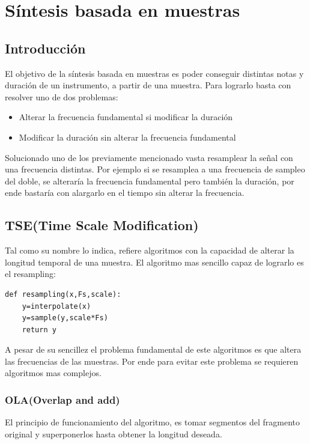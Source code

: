 \documentclass[../ASSD_TP2.tex]{subfiles}
\begin{document}
\section*{Síntesis basada en muestras}
\subsection*{Introducción}
El objetivo de la síntesis basada en muestras es poder conseguir distintas notas y duración de un instrumento, a partir de una muestra. Para lograrlo basta con resolver uno de dos problemas:
\begin{itemize}
\item Alterar la frecuencia fundamental si modificar la duración
\item Modificar la duración sin alterar la frecuencia fundamental
\end{itemize}

Solucionado uno de los previamente mencionado vasta resamplear la se\~nal con una frecuencia distintas. Por ejemplo si se resamplea a una frecuencia de sampleo del doble, se alteraría la frecuencia fundamental pero también la duración, por ende bastaría con alargarlo en el tiempo sin alterar la frecuencia.
\subsection*{TSE(Time Scale Modification)}
Tal como su nombre lo indica, refiere  algoritmos con la capacidad de alterar la longitud temporal de una muestra. El algoritmo mas sencillo capaz de lograrlo es el resampling:

\begin{lstlisting}
def resampling(x,Fs,scale):
	y=interpolate(x)
	y=sample(y,scale*Fs)
	return y
\end{lstlisting}
A pesar de su sencillez el problema fundamental de este algoritmos es que altera las frecuencias de las muestras. Por ende para evitar este problema se requieren algoritmos mas complejos.
\subsubsection*{OLA(Overlap and add)}
El principio de funcionamiento del algoritmo, es tomar segmentos del fragmento original y superponerlos hasta obtener la longitud deseada.
\end{document}

